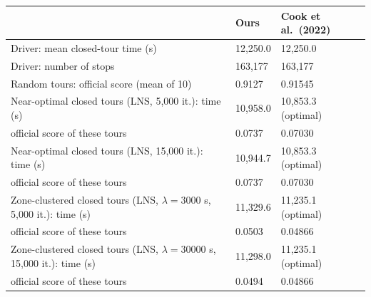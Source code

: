 \begin{tabular}{p{9.2cm}R{2.4cm}R{3.2cm}}
\toprule
 & Ours & Cook et al.\ (2022) \\
\midrule
Driver: mean closed-tour time (s) & 12,250.0 & 12,250.0 \\
Driver: number of stops & 163,177 & 163,177 \\
Random tours: official score (mean of 10) & 0.9127 & 0.91545 \\
Near-optimal closed tours (LNS, 5,000 it.): time (s) & 10,958.0 & 10,853.3 (optimal) \\
\hspace{1.5em}official score of these tours & 0.0737 & 0.07030 \\
Near-optimal closed tours (LNS, 15,000 it.): time (s) & 10,944.7 & 10,853.3 (optimal) \\
\hspace{1.5em}official score of these tours & 0.0737 & 0.07030 \\
Zone-clustered closed tours (LNS, $\lambda=3000$ s, 5,000 it.): time (s) & 11,329.6 & 11,235.1 (optimal) \\
\hspace{1.5em}official score of these tours & 0.0503 & 0.04866 \\
Zone-clustered closed tours (LNS, $\lambda=30000$ s, 15,000 it.): time (s) & 11,298.0 & 11,235.1 (optimal) \\
\hspace{1.5em}official score of these tours & 0.0494 & 0.04866 \\
\bottomrule
\end{tabular}

